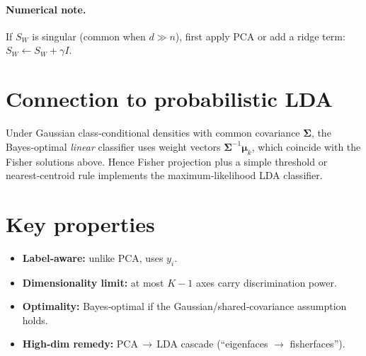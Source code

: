 \paragraph{Numerical note.}
If $S_W$ is singular (common when $d\gg n$), first apply PCA or add a ridge term:
$S_W\leftarrow S_W+\gamma I$.

\section{Connection to probabilistic LDA}

Under Gaussian class‑conditional densities with common covariance
$\boldsymbol\Sigma$, the Bayes‑optimal \emph{linear} classifier uses weight vectors
$\boldsymbol\Sigma^{-1}\boldsymbol\mu_k$, which coincide with the Fisher
solutions above.  Hence Fisher projection plus a simple threshold or nearest‑centroid rule
implements the maximum‑likelihood LDA classifier.

\section{Key properties}

\begin{itemize}
  \item \textbf{Label‑aware:} unlike PCA, uses $y_i$.
  \item \textbf{Dimensionality limit:} at most $K-1$ axes carry discrimination power.
  \item \textbf{Optimality:} Bayes‑optimal if the Gaussian/shared‑covariance assumption holds.
  \item \textbf{High‑dim remedy:} PCA\,$\rightarrow$\,LDA cascade (``eigenfaces $\rightarrow$ fisherfaces'').
\end{itemize}
